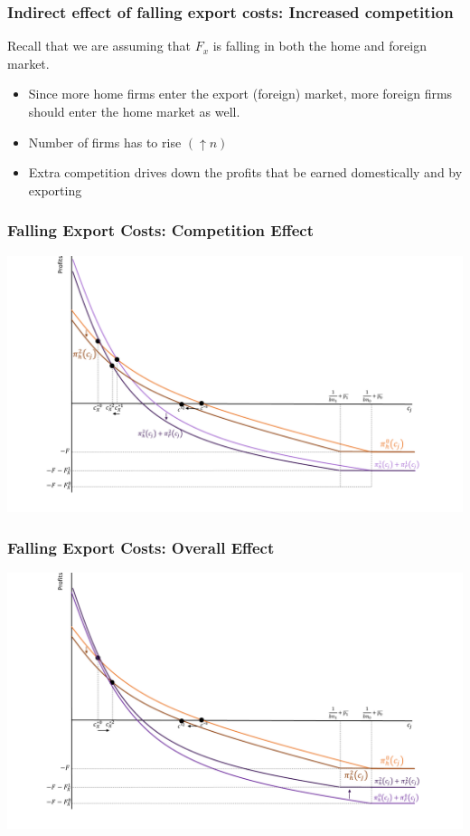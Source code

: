\documentclass{beamer}
\begin{document}
\begin{frame}
	\frametitle{Indirect effect of falling export costs: Increased competition}
Recall that we are assuming that $F_x$ is falling in both the home and foreign market.
	\begin{itemize}
		\item Since more home firms enter the export (foreign) market, more foreign firms should enter the home market as well.
		\item Number of firms has to rise $(\uparrow n)$
		\item Extra competition drives down the profits that be earned domestically and by exporting
	\end{itemize}
\end{frame}

\begin{frame}
	\frametitle{Falling Export Costs: Competition Effect}
	\includegraphics[scale=0.32]{SL4_12.pdf}
	
\end{frame}

\begin{frame}
	\frametitle{Falling Export Costs: Overall Effect}
	\includegraphics[scale=0.32]{SL4_13.pdf}
	
\end{frame}
\end{document}
